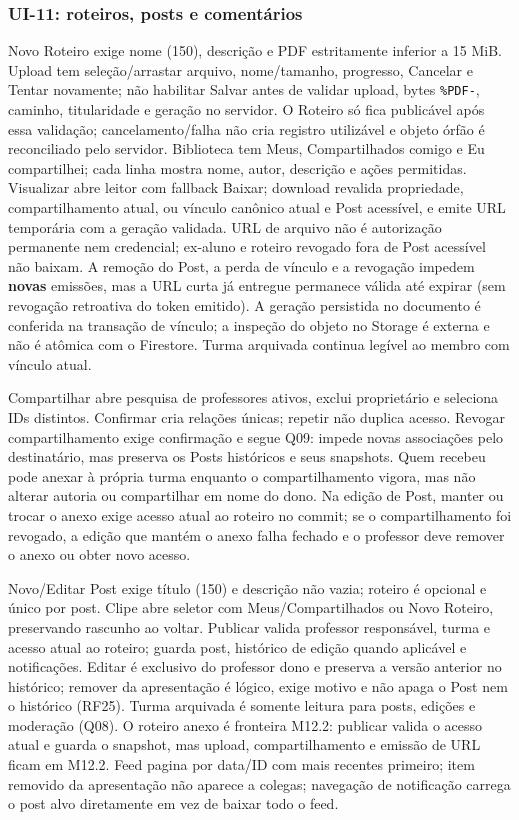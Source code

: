 \subsubsection{UI-11: roteiros, posts e comentários}
Novo Roteiro exige nome (150), descrição e PDF estritamente inferior a 15 MiB. Upload tem seleção/arrastar arquivo, nome/tamanho, progresso, Cancelar e Tentar novamente; não habilitar Salvar antes de validar upload, bytes \texttt{\%PDF-}, caminho, titularidade e geração no servidor. O Roteiro só fica publicável após essa validação; cancelamento/falha não cria registro utilizável e objeto órfão é reconciliado pelo servidor. Biblioteca tem Meus, Compartilhados comigo e Eu compartilhei; cada linha mostra nome, autor, descrição e ações permitidas. Visualizar abre leitor com fallback Baixar; download revalida propriedade, compartilhamento atual, ou vínculo canônico atual e Post acessível, e emite URL temporária com a geração validada. URL de arquivo não é autorização permanente nem credencial; ex-aluno e roteiro revogado fora de Post acessível não baixam. A remoção do Post, a perda de vínculo e a revogação impedem \textbf{novas} emissões, mas a URL curta já entregue permanece válida até expirar (sem revogação retroativa do token emitido). A geração persistida no documento é conferida na transação de vínculo; a inspeção do objeto no Storage é externa e não é atômica com o Firestore. Turma arquivada continua legível ao membro com vínculo atual.

Compartilhar abre pesquisa de professores ativos, exclui proprietário e seleciona IDs distintos. Confirmar cria relações únicas; repetir não duplica acesso. Revogar compartilhamento exige confirmação e segue Q09: impede novas associações pelo destinatário, mas preserva os Posts históricos e seus snapshots. Quem recebeu pode anexar à própria turma enquanto o compartilhamento vigora, mas não alterar autoria ou compartilhar em nome do dono. Na edição de Post, manter ou trocar o anexo exige acesso atual ao roteiro no commit; se o compartilhamento foi revogado, a edição que mantém o anexo falha fechado e o professor deve remover o anexo ou obter novo acesso.

Novo/Editar Post exige título (150) e descrição não vazia; roteiro é opcional e único por post. Clipe abre seletor com Meus/Compartilhados ou Novo Roteiro, preservando rascunho ao voltar. Publicar valida professor responsável, turma e acesso atual ao roteiro; guarda post, histórico de edição quando aplicável e notificações. Editar é exclusivo do professor dono e preserva a versão anterior no histórico; remover da apresentação é lógico, exige motivo e não apaga o Post nem o histórico (RF25). Turma arquivada é somente leitura para posts, edições e moderação (Q08). O roteiro anexo é fronteira M12.2: publicar valida o acesso atual e guarda o snapshot, mas upload, compartilhamento e emissão de URL ficam em M12.2. Feed pagina por data/ID com mais recentes primeiro; item removido da apresentação não aparece a colegas; navegação de notificação carrega o post alvo diretamente em vez de baixar todo o feed.

